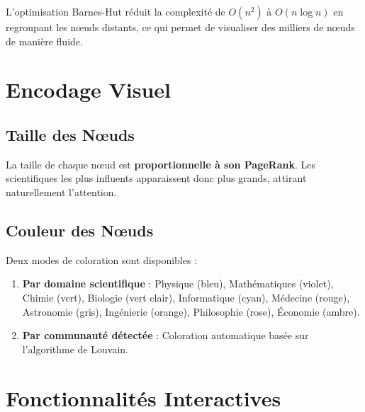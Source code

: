 \documentclass[12pt,a4paper]{report}
\begin{document}
L'optimisation Barnes-Hut réduit la complexité de $O(n^2)$ à $O(n \log n)$ en regroupant les nœuds distants, ce qui permet de visualiser des milliers de nœuds de manière fluide.

\section{Encodage Visuel}

\subsection{Taille des Nœuds}

La taille de chaque nœud est \textbf{proportionnelle à son PageRank}. Les scientifiques les plus influents apparaissent donc plus grands, attirant naturellement l'attention.

\subsection{Couleur des Nœuds}

Deux modes de coloration sont disponibles :

\begin{enumerate}
    \item \textbf{Par domaine scientifique} : Physique (bleu), Mathématiques (violet), Chimie (vert), Biologie (vert clair), Informatique (cyan), Médecine (rouge), Astronomie (gris), Ingénierie (orange), Philosophie (rose), Économie (ambre).

    \item \textbf{Par communauté détectée} : Coloration automatique basée sur l'algorithme de Louvain.
\end{enumerate}

\section{Fonctionnalités Interactives}
\end{document}
